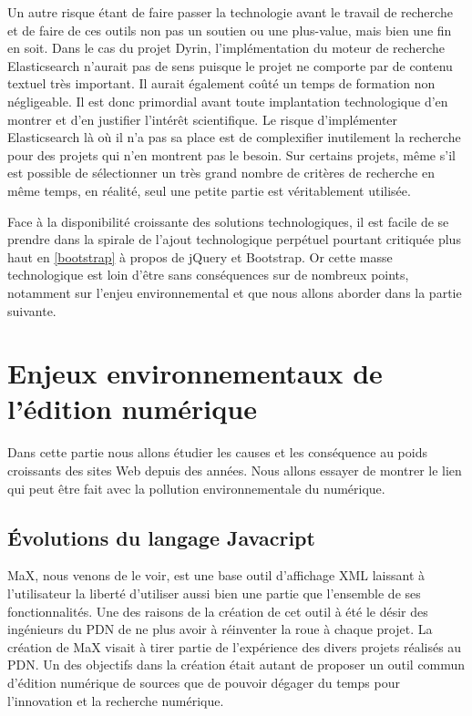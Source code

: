 \documentclass[a4paper,12pt,twoside]{book}
\begin{document}
Un autre risque étant de faire passer la technologie avant le travail de recherche et de faire de ces outils non pas un soutien ou une plus-value, mais bien une fin en soit. Dans le cas du projet Dyrin, l'implémentation du moteur de recherche Elasticsearch n'aurait pas de sens puisque le projet ne comporte par de contenu textuel très important. Il aurait également coûté un temps de formation non négligeable. Il est donc primordial avant toute implantation technologique d'en montrer et d'en justifier l'intérêt scientifique. Le risque d'implémenter Elasticsearch là où il n'a pas sa place est de complexifier inutilement la recherche pour des projets qui n'en montrent pas le besoin. Sur certains projets, même s'il est possible de sélectionner un très grand nombre de critères de recherche en même temps, en réalité, seul une petite partie est véritablement utilisée. 

Face à la disponibilité croissante des solutions technologiques, il est facile de se prendre dans la spirale de l'ajout technologique perpétuel pourtant critiquée plus haut en \ref{bootstrap} à propos de jQuery et Bootstrap. Or cette masse technologique est loin d'être sans conséquences sur de nombreux points, notamment sur l'enjeu environnemental et que nous allons aborder dans la partie suivante.

\chapter{Enjeux environnementaux de l'édition numérique}
Dans cette partie nous allons étudier les causes et les conséquence au poids croissants des sites Web depuis des années. Nous allons essayer de montrer le lien qui peut être fait avec la pollution environnementale du numérique.

\section{Évolutions du langage Javacript}
MaX, nous venons de le voir, est une base outil d'affichage XML laissant à l'utilisateur la liberté d'utiliser aussi bien une partie que l'ensemble de ses fonctionnalités. Une des raisons de la création de cet outil à été le désir des ingénieurs du \acrshort{PDN} de ne plus avoir à \og réinventer la roue\fg{} à chaque projet. La création de MaX visait à tirer partie de l'expérience des divers projets réalisés au \acrshort{PDN}. Un des objectifs dans la création était autant de proposer un outil commun d'édition numérique de sources que de pouvoir dégager du temps pour l'innovation et la recherche numérique.
\end{document}
